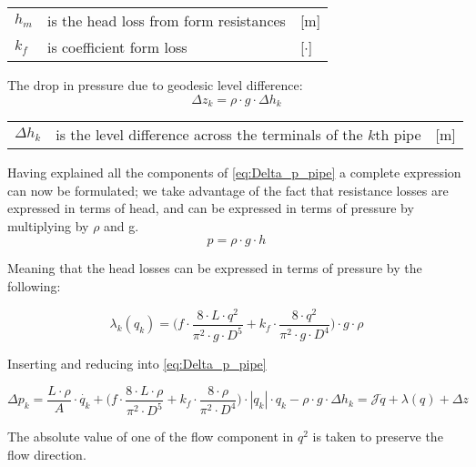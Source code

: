 \begin{center}
	\begin{tabular}{l p{8cm} l}
		$h_{m}$ & is the head loss from form resistances & [\si{m}]\\
		$k_{f}$ &  is coefficient form loss & [$\cdot$]\\
	\end{tabular}
\end{center}

The drop in pressure due to geodesic level difference:
\begin{equation}
	\Delta{z_{k}} = \rho \cdot g \cdot \Delta{h_{k}}
\end{equation}

\begin{center}
	\begin{tabular}{l p{8cm} l}
		$\Delta{h_{k}}$ &  is the level difference across the terminals of the $k$th pipe & [\si{m}]\\
	\end{tabular}
\end{center}

Having explained all the components of \eqref{eq:Delta_p_pipe} a complete expression can now be formulated; we take advantage of the fact that resistance losses are expressed in terms of head, and can be expressed in terms of pressure by multiplying by $\rho$ and g. \begin{equation}
	p = \rho \cdot g \cdot h  
\end{equation}

Meaning that the head losses can be expressed in terms of pressure by the following:

\begin{equation}
\lambda_{k}(q_{k})  =	\Big(f \cdot \frac{8\cdot L\cdot q^{2}}{\pi^{2}\cdot g \cdot D^{5}} + k_{f}\cdot \frac{8\cdot q^{2}}{\pi^{2}\cdot g \cdot D^{4}}\Big)\cdot g \cdot \rho
\end{equation}

Inserting and reducing into \cref{eq:Delta_p_pipe}

\begin{equation}
	\Delta{p_{k}} = \frac{L\cdot \rho}{A}\cdot \dot{q_{k}}
	+\Big(f \cdot \frac{8\cdot L\cdot \rho}{\pi^{2} \cdot D^{5}} + k_{f}\cdot \frac{8\cdot \rho}{\pi^{2} \cdot D^{4}}\Big)\cdot |q_{k}|\cdot q_{k} 
	- \rho \cdot g \cdot \Delta{h_{k}} = \mathcal{J}\dot{q} + \lambda(q) + \Delta z
\end{equation}

The absolute value of one of the flow component in $q^{2}$ is taken to preserve the flow direction.


